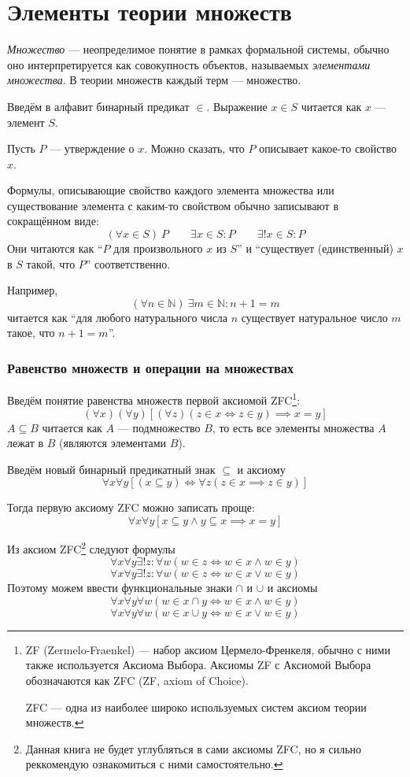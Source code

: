 \part{Элементы теории множеств}

{\it Множество} --- неопределимое понятие в рамках формальной системы,
обычно оно интерпретируется как совокупность объектов,
называемых {\it элементами множества}.
В теории множеств каждый терм --- множество.

Введём в алфавит бинарный предикат $\in$. Выражение $x\in S$ читается
как $x$ --- элемент $S$.

Пусть $P$ --- утверждение о $x$. Можно сказать, что $P$ описывает какое-то
свойство $x$.

Формулы, описывающие свойство каждого элемента множества или
существование элемента с каким-то свойством обычно записывают в сокращённом виде:
\[
	(\forall x\in S)~P\qquad \exists x\in S:P\qquad \exists!x\in S:P
\]
Они читаются как ``$P$ для произвольного $x$ из $S$'' и
``существует (единственный) $x$ в $S$ такой, что $P$'' соответственно.

\newcommand\N{\mathbb N}
Например,
\[
	(\forall n\in\N)~\exists m\in\N:n+1=m
\]
читается как ``для любого натурального числа $n$ существует натуральное число
$m$ такое, что $n+1=m$''.

\section{Равенство множеств и операции на множествах}

Введём понятие равенства множеств первой аксиомой ZFC\footnote{
	ZF (Zermelo-Fraenkel) --- набор аксиом Цермело-Френкеля, обычно с ними также
	используется Аксиома Выбора. Аксиомы ZF с Аксиомой Выбора
	обозначаются как ZFC (ZF, axiom of Choice).

	ZFC --- одна из наиболее широко используемых систем аксиом теории множеств.
}:
\[
	(\forall x)(\forall y)[(\forall z)(z\in x\iff z\in y)\implies x=y]
\]
$A\subseteq B$ читается как $A$ --- подмножество $B$, то есть все
элементы множества $A$ лежат в $B$ (являются элементами $B$).

Введём новый бинарный предикатный знак $\subseteq$ и аксиому
\[
	\forall x\forall y[(x\subseteq y)\iff \forall z(z\in x\implies z\in y)]
\]

Тогда первую аксиому ZFC можно записать проще:
\[
	\forall x\forall y[x\subseteq y\land y\subseteq x\implies x=y]
\]

Из аксиом ZFC\footnote{
	Данная книга не будет углубляться в сами аксиомы ZFC, но я сильно реккомендую
	ознакомиться с ними самостоятельно.
} следуют формулы
\[
	\forall x\forall y\exists! z:\forall w(w\in z\iff w\in x\land w\in y)
\]
\[
	\forall x\forall y\exists! z:\forall w(w\in z\iff w\in x\lor w\in y)
\]
Поэтому можем ввести функциональные знаки $\cap$ и $\cup$ и аксиомы
\[
	\forall x\forall y\forall w(w\in x\cap y\iff w\in x\land w\in y)
\]
\[
	\forall x\forall y\forall w(w\in x\cup y\iff w\in x\lor w\in y)
\]

